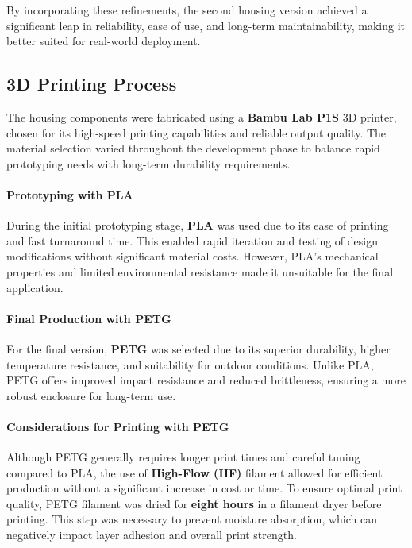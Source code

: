 By incorporating these refinements, the second housing version achieved a significant leap in reliability, ease of use, and long-term maintainability, making it better suited for real-world deployment.  

\subsection{3D Printing Process}  

The housing components were fabricated using a \textbf{Bambu Lab P1S} 3D printer, chosen for its high-speed printing capabilities and reliable output quality. The material selection varied throughout the development phase to balance rapid prototyping needs with long-term durability requirements.  

\paragraph{Prototyping with PLA}  
During the initial prototyping stage, \textbf{PLA} was used due to its ease of printing and fast turnaround time. This enabled rapid iteration and testing of design modifications without significant material costs. However, PLA's mechanical properties and limited environmental resistance made it unsuitable for the final application.  

\paragraph{Final Production with PETG}  
For the final version, \textbf{PETG} was selected due to its superior durability, higher temperature resistance, and suitability for outdoor conditions. Unlike PLA, PETG offers improved impact resistance and reduced brittleness, ensuring a more robust enclosure for long-term use.  

\paragraph{Considerations for Printing with PETG}  
Although PETG generally requires longer print times and careful tuning compared to PLA, the use of \textbf{High-Flow (HF)} filament allowed for efficient production without a significant increase in cost or time. To ensure optimal print quality, PETG filament was dried for \textbf{eight hours} in a filament dryer before printing. This step was necessary to prevent moisture absorption, which can negatively impact layer adhesion and overall print strength.  

